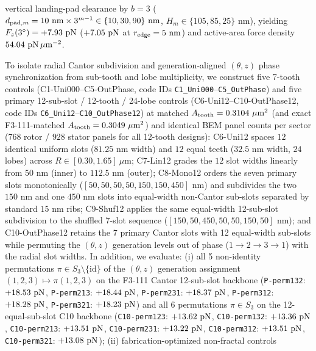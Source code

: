 \documentclass[pdflatex,sn-nature]{sn-jnl}
\DeclareRobustCommand{\roundtwo}[1]{\fpeval{round(#1,2)}}
\DeclareRobustCommand{\roundfour}[1]{\fpeval{round(#1,4)}}
\begin{document}
vertical landing-pad clearance by $b=3$ ($d_{{\rm pad},m} = 10\text{ nm} \times 3^{m-1} \in \{10, 30, 90\}\text{ nm}$, $H_m \in \{105, 85, 25\}\text{ nm}$), yielding $F_z(3^\circ) = +\roundtwo{\NthreeUnithreedStrictbthreeUnisoFzPn}\text{ pN}$ ($+\roundtwo{\NthreeUnithreedStrictbthreeUnisoRfivenmFzPn}\text{ pN}$ at $r_{\rm edge}=5\text{ nm}$) and active-area force density $\roundtwo{\NthreeUnithreedStrictbthreeUnisoFa}\text{ pN}\,\mu\text{m}^{-2}$.

To isolate radial Cantor subdivision and generation-aligned $(\theta, z)$ phase synchronization from sub-tooth and lobe multiplicity, we construct five 7-tooth controls (C1-Uni000--C5-OutPhase, code IDs \texttt{C1\_Uni000}--\texttt{C5\_OutPhase}) and five primary 12-sub-slot / 12-tooth / 24-lobe controls (C6-Uni12--C10-OutPhase12, code IDs \texttt{C6\_Uni12}--\texttt{C10\_OutPhase12}) at matched $A_{\rm tooth} = \roundfour{\NthreeUnithreedFzerozerozeroAreaUmtwo}\ \mu\text{m}^2$ (and exact F3-111-matched $A_{\rm tooth} = \roundfour{\NthreeUnithreedFoneoneoneUnifiedAreaUmtwo}\ \mu\text{m}^2$) and identical BEM panel counts per sector ($768$ rotor / $928$ stator panels for all 12-tooth designs): C6-Uni12 spaces $12$ identical uniform slots ($81.25\text{ nm}$ width) and $12$ equal teeth ($32.5\text{ nm}$ width, $24$ lobes) across $R \in [0.30, 1.65]\ \mu\text{m}$; C7-Lin12 grades the $12$ slot widths linearly from $50\text{ nm}$ (inner) to $112.5\text{ nm}$ (outer); C8-Mono12 orders the seven primary slots monotonically ($[50, 50, 50, 50, 150, 150, 450]\text{ nm}$) and subdivides the two $150\text{ nm}$ and one $450\text{ nm}$ slots into equal-width non-Cantor sub-slots separated by standard $15\text{ nm}$ ribs; C9-Shuf12 applies the same equal-width 12-sub-slot subdivision to the shuffled 7-slot sequence ($[150, 50, 450, 50, 50, 150, 50]\text{ nm}$); and C10-OutPhase12 retains the 7 primary Cantor slots with 12 equal-width sub-slots while permuting the $(\theta, z)$ generation levels out of phase ($1 \to 2 \to 3 \to 1$) with the radial slot widths. In addition, we evaluate: (i) all 5 non-identity permutations $\pi \in S_3 \setminus \{\mathrm{id}\}$ of the $(\theta, z)$ generation assignment $(1,2,3) \mapsto \pi(1,2,3)$ on the F3-111 Cantor 12-sub-slot backbone (\texttt{P-perm132}: $+\roundtwo{\NthreePermPPermonethreetwoFzPn}\text{ pN}$, \texttt{P-perm213}: $+\roundtwo{\NthreePermPPermtwoonethreeFzPn}\text{ pN}$, \texttt{P-perm231}: $+\roundtwo{\NthreePermPPermtwothreeoneFzPn}\text{ pN}$, \texttt{P-perm312}: $+\roundtwo{\NthreePermPPermthreeonetwoFzPn}\text{ pN}$, \texttt{P-perm321}: $+\roundtwo{\NthreePermPPermthreetwooneFzPn}\text{ pN}$) and all 6 permutations $\pi \in S_3$ on the 12-equal-sub-slot C10 backbone (\texttt{C10-perm123}: $+\roundtwo{\NthreePermConezeroPermonetwothreeFzPn}\text{ pN}$, \texttt{C10-perm132}: $+\roundtwo{\NthreePermConezeroPermonethreetwoFzPn}\text{ pN}$, \texttt{C10-perm213}: $+\roundtwo{\NthreePermConezeroPermtwoonethreeFzPn}\text{ pN}$, \texttt{C10-perm231}: $+\roundtwo{\NthreePermConezeroPermtwothreeoneFzPn}\text{ pN}$, \texttt{C10-perm312}: $+\roundtwo{\NthreePermConezeroPermthreeonetwoFzPn}\text{ pN}$, \texttt{C10-perm321}: $+\roundtwo{\NthreePermConezeroPermthreetwooneFzPn}\text{ pN}$); (ii) fabrication-optimized non-fractal controls 
\end{document}
